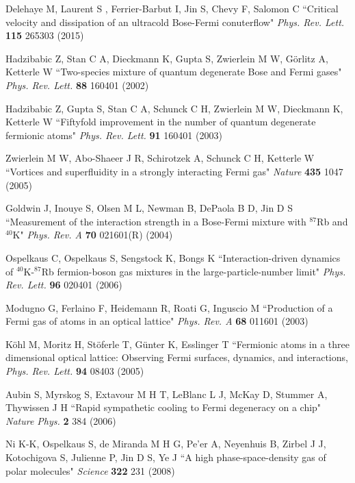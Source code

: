 \documentclass[pra,letterpaper,twocolumn,showpacs,superscriptaddress]{revtex4}
\begin{document}
\begin{thebibliography}{300}
 Delehaye M, Laurent S , Ferrier-Barbut I, Jin S, Chevy F, Salomon C
``Critical velocity and dissipation of an ultracold Bose-Fermi conuterflow"
{\it Phys. Rev. Lett.} \textbf{115} 265303 (2015)

 Hadzibabic Z, Stan C A, Dieckmann K, Gupta S, Zwierlein M W, G\"orlitz A, Ketterle W
``Two-species mixture of quantum degenerate Bose and Fermi gases" 
{\it Phys. Rev. Lett.} \textbf{88} 160401 (2002)

Hadzibabic Z, Gupta S, Stan C A, Schunck C H, Zwierlein M W, Dieckmann K, Ketterle W
``Fiftyfold improvement in the number of quantum degenerate fermionic atoms"
{\it Phys. Rev. Lett.} \textbf{91} 160401 (2003)

 Zwierlein M W, Abo-Shaeer J R, Schirotzek A, Schunck C H, Ketterle W 
``Vortices and superfluidity in a strongly interacting Fermi gas"
{\it Nature} \textbf{435} 1047 (2005)

 Goldwin J, Inouye S, Olsen M L, Newman B, DePaola B D, Jin D S
``Measurement of the interaction strength in a Bose-Fermi mixture with ${}^{87}$Rb and ${}^{40}$K"
{\it Phys. Rev. A} \textbf{70} 021601(R) (2004)

 Ospelkaus C, Ospelkaus S, Sengstock K, Bongs K
``Interaction-driven dynamics of ${}^{40}$K-${}^{87}$Rb fermion-boson gas mixtures in the large-particle-number limit"
{\it Phys. Rev. Lett.} \textbf{96} 020401 (2006)

 Modugno G, Ferlaino F, Heidemann R, Roati G, Inguscio M
``Production of a Fermi gas of atoms in an optical lattice"
{\it Phys. Rev. A} \textbf{68} 011601 (2003)

 K\"ohl M, Moritz H, St\"oferle T, G\"unter K, Esslinger T
``Fermionic atoms in a three dimensional optical lattice: Observing Fermi surfaces, dynamics, and interactions,
{\it Phys. Rev. Lett.} \textbf{94} 08403 (2005)

 Aubin S, Myrskog S, Extavour M H T, LeBlanc L J, McKay D, Stummer A, Thywissen J H
``Rapid sympathetic cooling to Fermi degeneracy on a chip"
{\it Nature Phys.} \textbf{2} 384 (2006)

 Ni K-K, Ospelkaus S, de Miranda M H G, Pe'er A, Neyenhuis B, Zirbel J J, Kotochigova S, Julienne P, Jin D S, Ye J
``A high phase-space-density gas of polar molecules"
{\it Science} \textbf{322} 231 (2008)


\end{thebibliography}
\end{document}
